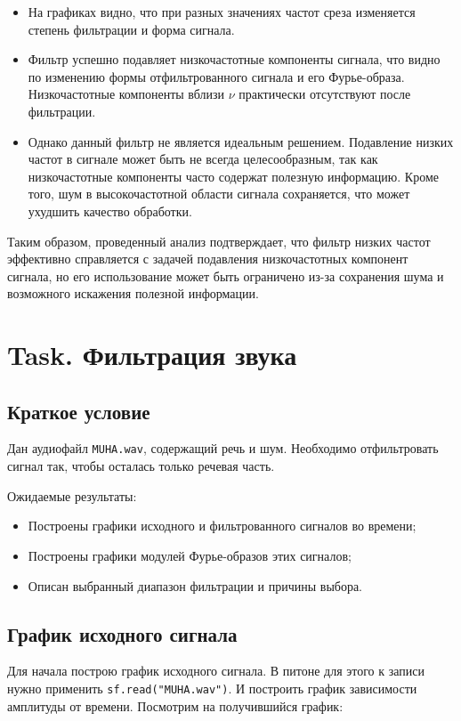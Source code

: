 \documentclass[a4paper,12pt]{article}
\begin{document}
\begin{itemize}
    \item На графиках видно, что при разных значениях частот среза изменяется степень фильтрации и форма сигнала.
    \item Фильтр успешно подавляет низкочастотные компоненты сигнала, что видно по изменению формы отфильтрованного сигнала и его Фурье-образа. Низкочастотные компоненты вблизи \(\nu\) практически отсутствуют после фильтрации.
    \item Однако данный фильтр не является идеальным решением. Подавление низких частот в сигнале может быть не всегда целесообразным, так как низкочастотные компоненты часто содержат полезную информацию. Кроме того, шум в высокочастотной области сигнала сохраняется, что может ухудшить качество обработки.
\end{itemize}
Таким образом, проведенный анализ подтверждает, что фильтр низких частот эффективно справляется с задачей подавления низкочастотных компонент сигнала, но его использование может быть ограничено из-за сохранения шума и возможного искажения полезной информации.

\section{Task. Фильтрация звука}
\subsection{Краткое условие}


Дан аудиофайл \texttt{MUHA.wav}, содержащий речь и шум. Необходимо отфильтровать сигнал так, чтобы осталась только речевая часть.

Ожидаемые результаты:
\begin{itemize}
    \item Построены графики исходного и фильтрованного сигналов во времени;
    \item Построены графики модулей Фурье-образов этих сигналов;
    \item Описан выбранный диапазон фильтрации и причины выбора.
\end{itemize}

\subsection{График исходного сигнала}

Для начала построю график исходного сигнала. В питоне для этого к 
записи нужно применить \texttt{sf.read("MUHA.wav")}. И построить
график зависимости амплитуды от времени. Посмотрим на получившийся 
график:
\end{document}
